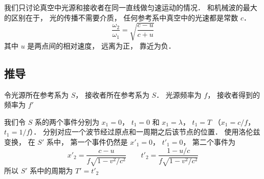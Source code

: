 

我们只讨论真空中光源和接收者在同一直线做匀速运动的情况． 和机械波的最大的区别在于， 光的传播不需要介质， 任何参考系中真空中的光速都是常数 $c$． %
\begin{equation}
\frac{\omega_2}{\omega_1} = \sqrt{\frac{c - u}{c + u}}
\end{equation}
其中 $u$ 是两点间的相对速度， 远离为正， 靠近为负．

\subsection{推导}
令光源所在参考系为 $S$， 接收者所在参考系为 $S$． 光源频率为 $f$， 接收者得到的频率为 $f'$

我们令 $S$ 系的两个事件分别为 $x_1 = 0$， $t_1 = 0$ 和 $x_1 = \lambda$， $t_1 = T$ （$x_1 = c/f$， $t_1 = 1/f$）． 分别对应一个波节经过原点和一周期之后该节点的位置． 使用洛伦兹变换， 在 $S'$ 系中， 第一个事件仍然是 $x'_1 = 0$， $t'_1 = 0$， 第二个事件为
\begin{equation}
x'_2 = \frac{c - u}{f\sqrt{1 - v^2/c^2}} \qquad
t'_2 = \frac{1 - u/c}{f\sqrt{1 - v^2/c^2}}
\end{equation}
所以 $S'$ 系中的周期为 $T' = t'_2$

